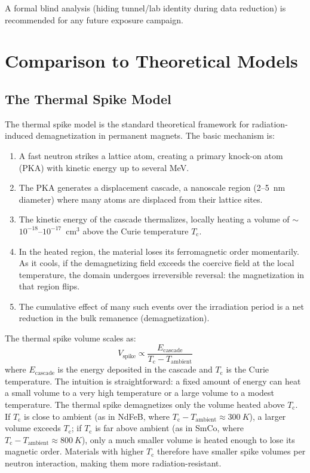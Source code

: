 \documentclass[11pt,letterpaper]{article}
\newcommand{\Tc}{T_\mathrm{c}}
\begin{document}
A formal blind analysis (hiding tunnel/lab identity during data reduction) is
recommended for any future exposure campaign.

\section{Comparison to Theoretical Models}
\label{sec:theory}

\subsection{The Thermal Spike Model}
\label{sec:thermal_spike}

The thermal spike model \cite{Cost1988,Samin2018} is the standard theoretical
framework for radiation-induced demagnetization in permanent magnets. The basic
mechanism is:

\begin{enumerate}
    \item A fast neutron strikes a lattice atom, creating a primary
    knock-on atom (PKA) with kinetic energy up to several MeV.
    \item The PKA generates a displacement cascade, a nanoscale
    region (2--\SI{5}{nm} diameter) where many atoms are displaced from their
    lattice sites.
    \item The kinetic energy of the cascade thermalizes, locally heating a
    volume of $\sim$$10^{-18}$--$10^{-17}$~cm$^3$ above the Curie
    temperature $\Tc$.
    \item In the heated region, the material loses its ferromagnetic order
    momentarily. As it cools, if the demagnetizing field exceeds the
    coercive field at the local temperature, the domain undergoes
    irreversible reversal: the magnetization in that region flips.
    \item The cumulative effect of many such events over the irradiation period
    is a net reduction in the bulk remanence (demagnetization).
\end{enumerate}

The thermal spike volume scales as:
\begin{equation}
    V_\mathrm{spike} \propto \frac{E_\mathrm{cascade}}{T_\mathrm{c} - T_\mathrm{ambient}}
\end{equation}
where $E_\mathrm{cascade}$ is the energy deposited in the cascade and $\Tc$
is the Curie temperature. The intuition is straightforward: a fixed amount of
energy can heat a small volume to a very high temperature or a large volume to
a modest temperature. The thermal spike demagnetizes only the volume heated
above $\Tc$. If $\Tc$ is close to ambient (as in NdFeB, where
$\Tc - T_\mathrm{ambient} \approx \SI{300}{K}$), a larger volume exceeds
$\Tc$; if $\Tc$ is far above ambient (as in SmCo, where
$\Tc - T_\mathrm{ambient} \approx \SI{800}{K}$), only a much smaller volume
is heated enough to lose its magnetic order. Materials with higher $\Tc$
therefore have smaller spike volumes per neutron interaction, making them more
radiation-resistant.
\end{document}
